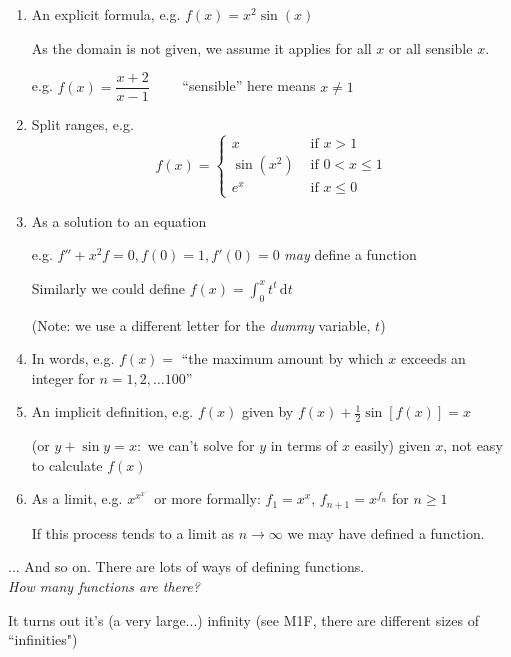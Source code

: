 \documentclass[10pt]{scrartcl}
\begin{document}
\begin{enumerate}
\item An explicit formula, e.g. $f(x) = x^2\sin(x)$
 
As the domain is not given, we assume it applies for all $x$ or all sensible $x$. 

e.g. $f(x) = \dfrac{x+2}{x-1} \qquad$ ``sensible'' here means $x \neq 1$\\

\item Split ranges, e.g.
\[f(x) = \begin{cases}
 x & \text{ if }  x > 1\\
 \sin(x^2) & \text{ if } 0 < x \leq 1\\
 e^x & \text{ if } x \leq 0
 \end{cases}\]
 
 
\item As a solution to an equation

e.g. $f'' + x^2f = 0, f(0) = 1, f'(0) = 0$ \textit{may} define a function
 
Similarly we could define $f(x) = \displaystyle{\int_0^x t^t \, \mathrm{d}t}$

(Note: we use a different letter for the \textit{dummy} variable, $t$)\\

\item In words, e.g. $f(x) =$ ``the maximum amount by which $x$ exceeds an integer for $ n = 1,2,\dots 100$''

\item An implicit definition, e.g. $f(x)$ given by $f(x) + \frac{1}{2}\sin[f(x)] = x$

(or $y + \sin y = x :$ we can't solve for $y$ in terms of $x$ easily) given $x$, not easy to calculate $f(x)$\\

\item As a limit, e.g. $x^{x^{x^{\iddots}}}$ or more formally: $f_1 = x^x$, $f_{n+1} = x^{f_n}$ for $n \geq 1$

If this process tends to a limit as $n \to \infty$ we may have defined a function.
\end{enumerate}\vspace*{5pt}

... And so on. There are lots of ways of defining functions.\\

\emph{How many functions are there?}

It turns out it's (a very large...) infinity (see M1F, there are different sizes of ``infinities")
\end{document}
